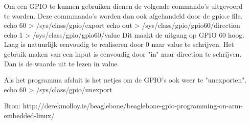 Om een GPIO te kunnen gebruiken dienen de volgende commando's uitgevoerd te worden.
Deze commmando's worden dan ook afgehandeld door de gpio.c file.
echo 60 > /sys/class/gpio/export
echo out > /sys/class/gpio/gpio60/direction
echo 1 > /sys/class/gpio/gpio60/value
Dit maakt de uitgang op GPIO 60 hoog. Laag is natuurlijk eenvoudig te realiseren 
door 0 naar value te schrijven.
Het gebruik maken van een input is eenvoudig door "in" naar direction te schrijven. 
Dan is de waarde uit te lezen in value.

Als het programma afsluit is het netjes om de GPIO's ook weer te "unexporten".
echo 60 > /sys/class/gpio/unexport

Bron: http://derekmolloy.ie/beaglebone/beaglebone-gpio-programming-on-arm-embedded-linux/